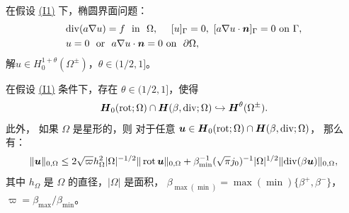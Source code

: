 \documentclass[notheorems,serif]{beamer}
\begin{document}
\begin{frame}
\small
\begin{lemma}
在假设 \hyperref[asp:I1]{(I1)} 下，椭圆界面问题：
\begin{equation}
\begin{split}
\label{H1eqn}
& \mathrm{div}(a\nabla u) = f ~~ \text{in} ~~ \Omega, ~~~~ [u]_{\Gamma} =0, ~ [a\nabla
u\cdot\boldsymbol{n}]_{\Gamma}=0 ~ \text{on} ~ \Gamma,\\
& u=0 ~~ \text{or} ~~ a\nabla u \cdot \boldsymbol{n} =0 ~ \text{on} ~~ \partial\Omega,
\end{split}
\end{equation}
解$u\in H^{1+\theta}_0(\Omega^{\pm})$，$\theta\in(1/2,1]$。
\end{lemma}

\begin{lemma}
\label{lem_embd_1}
在假设 \hyperref[asp:I1]{(I1)} 条件下，存在 $\theta\in(1/2,1]$，使得
\begin{equation}
\label{lem_embd_1_eq0}
\boldsymbol{H}_0(\operatorname{rot};\Omega)\cap \boldsymbol{H}(\beta, \mathrm{div};\Omega) \hookrightarrow \boldsymbol{H}^{\theta}(\Omega^{\pm}).
\end{equation}
此外，
如果 $\Omega$ 是星形的，则
对于任意 $\boldsymbol{u}\in \boldsymbol{H}_0(\operatorname{rot};\Omega)\cap \boldsymbol{H}(\beta, \mathrm{div};\Omega)$，
那么有：
\begin{equation}
  \label{lem_embd_1_eq01}
  \| \boldsymbol{u} \|_{0,\Omega} 
  \le 2 \sqrt{\varpi}  h^2_{\Omega}|\Omega|^{-1/2} \|\operatorname{rot} \boldsymbol{u} \|_{0,\Omega} 
  + \beta_{\min}^{-1} ( \sqrt{\pi} j_0)^{-1} |\Omega|^{1/2} \|\mathrm{div}(\beta \boldsymbol{u}) \|_{0,\Omega},
  \end{equation}
其中 $h_{\Omega}$ 是 $\Omega$ 的直径，$|\Omega|$ 是面积，
$\beta_{\max(\min)}=\max(\min)\{\beta^+,\beta^-\}$，
$\varpi = \beta_{\max}/\beta_{\min}$。
\end{lemma}
\end{frame}

\end{document}
